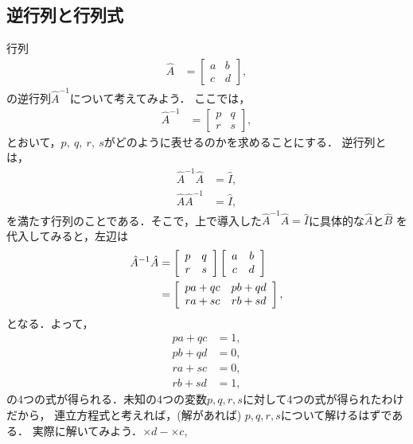 \subsection{逆行列と行列式\label{sec:2d_invmat}}
%
行列
\begin{align}
\hat{A} & =\left[\begin{array}{cc}
a & b\\
c & d
\end{array}\right],
\end{align}
の逆行列$\hat{A}^{-1}$について考えてみよう．
ここでは，
\begin{align}
\hat{A}^{-1} & =\left[\begin{array}{cc}
p & q\\
r & s
\end{array}\right],
\end{align}
とおいて，$p,~q,~r,~s$がどのように表せるのかを求めることにする．
逆行列とは，
\begin{align}
\hat{A}^{-1}\hat{A} & =\hat{I}, \\
\hat{A}\hat{A}^{-1} & =\hat{I},
\end{align}
を満たす行列のことである．そこで，上で導入した$\hat{A}^{-1}\hat{A} =\hat{I}$に具体的な$\hat{A}$と$\hat{B}$
を代入してみると，左辺は
\begin{align}
\hat{A}^{-1}\hat{A} & =\left[\begin{array}{cc}
p & q\\
r & s
\end{array}\right]\left[\begin{array}{cc}
a & b\\
c & d
\end{array}\right]\notag\\
 & =\left[\begin{array}{cc}
pa+qc & pb+qd\\
ra+sc & rb+sd
\end{array}\right],
\end{align}
となる．よって，
\begin{align}
pa+qc & =1,  \label{LA:qaqc}\\
pb+qd & =0,  \label{LA:qbqd}\\
ra+sc & =0,  \label{LA:rasc}\\
rb+sd & =1,  \label{LA:rbsd} 
\end{align}
の4つの式が得られる．未知の4つの変数$p,q,r,s$に対して4つの式が得られたわけだから，
連立方程式と考えれば，(解があれば) $p,q,r,s$について解けるはずである．
実際に解いてみよう．$\times d -$$\times c$, 
